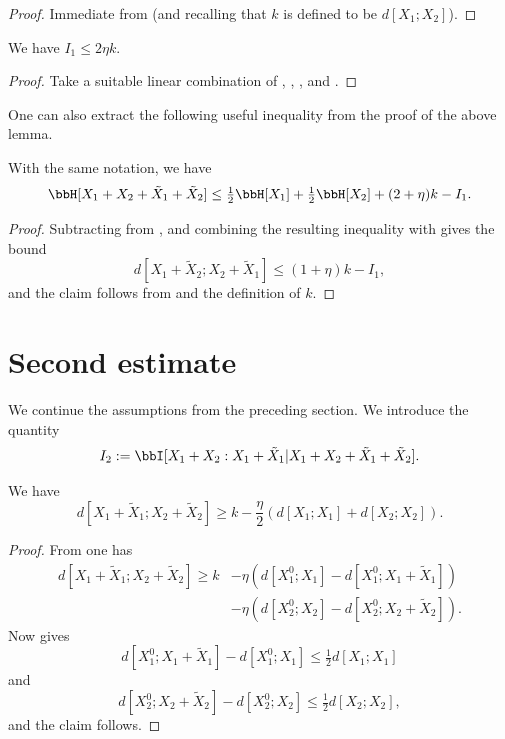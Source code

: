 \begin{proof} \leanok  Immediate from  (and recalling that $k$ is defined to be $d[X_1;X_2]$).
\end{proof}

\begin{lemma}\label{first-estimate}
  \leanok We have $I_1 \leq 2 \eta k$.
\end{lemma}

\begin{proof}\leanok  Take a suitable linear combination of , , , and .
\end{proof}

One can also extract the following useful inequality from the proof of the above lemma.

\begin{lemma}\label{foursum-bound}
  \leanok
  With the same notation, we have
  \begin{equation}
    \label{HS-bound}
    \bbH[X_1+X_2+\tilde X_1+\tilde X_2] \le \tfrac{1}{2} \bbH[X_1]+\tfrac{1}{2} \bbH[X_2] + (2 + \eta) k - I_1.
  \end{equation}
\end{lemma}

\begin{proof}\leanok
  Subtracting  from , and combining the resulting inequality with  gives the bound
\[
  d[X_1+\tilde X_2;X_2+\tilde X_1] \le (1 + \eta) k - I_1,
\]
and the claim follows from  and the definition of $k$.
\end{proof}


\section{Second estimate}

We continue the assumptions from the preceding section.
We introduce the quantity
$$ I_2 := \bbI[X_1+X_2 : X_1 + \tilde X_1 | X_1+X_2+\tilde X_1+\tilde X_2].$$

\begin{lemma}\label{dist-sums}
  \leanok
We have
$$ d[X_1+\tilde X_1; X_2+\tilde X_2] \geq k - \frac{\eta}{2} ( d[X_1; X_1] + d[X_2;X_2] ).$$
\end{lemma}

\begin{proof}\leanok From  one has
\begin{align*}
    d[X_1+\tilde X_1; X_2+\tilde X_2] \geq k &- \eta(d[X^0_1;X_1] - d[X^0_1;X_1+\tilde X_1]) \\
    &- \eta(d[X^0_2;X_2] - d[X^0_2;X_2+\tilde X_2]).
\end{align*}
Now  gives
$$
d[X^0_1;X_1+\tilde X_1] - d[X^0_1;X_1] \leq \tfrac{1}{2} d[X_1;X_1]$$
and
$$
  d[X^0_2;X_2+\tilde X_2] - d[X^0_2;X_2] \leq \tfrac{1}{2} d[X_2;X_2],
$$
and the claim follows.
\end{proof}

